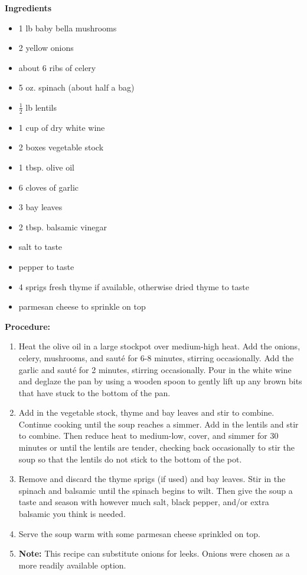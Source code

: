 \begin{multicols}{2}
\textbf{Ingredients}
\begin{itemize}
\item 1 lb baby bella mushrooms 

\item 2 yellow onions 
\item about 6 ribs of celery 
\item 5 oz. spinach (about half a bag)
\item $\frac{1}{2}$ lb lentils 
\item 1 cup of dry white wine 
\item 2 boxes vegetable stock
\item 1 tbsp. olive oil 
\item 6 cloves of garlic
\item 3 bay leaves
\item 2 tbsp. balsamic vinegar
\item salt to taste
\item pepper to taste
\item 4 sprigs fresh thyme if available, otherwise dried thyme to taste
\item parmesan cheese to sprinkle on top 


\end{itemize}


\columnbreak
\textbf{Procedure:}
\medskip


\begin{enumerate}
\item Heat the olive oil in a large stockpot over medium-high heat.  Add the onions, celery, mushrooms, and sauté for 6-8 minutes, stirring occasionally.  Add the garlic and sauté for 2 minutes, stirring occasionally.  Pour in the white wine and deglaze the pan by using a wooden spoon to gently lift up any brown bits that have stuck to the bottom of the pan. 

\item Add in the vegetable stock, thyme and bay leaves and stir to combine.  Continue cooking until the soup reaches a simmer.  Add in the lentils and stir to combine.  Then reduce heat to medium-low, cover, and simmer for 30 minutes or until the lentils are tender, checking back occasionally to stir the soup so that the lentils do not stick to the bottom of the pot.

\item Remove and discard the thyme sprigs (if used) and bay leaves.  Stir in the spinach and balsamic until the spinach begins to wilt.  Then give the soup a taste and season with however much salt, black pepper, and/or extra balsamic you think is needed.

\item Serve the soup warm with some parmesan cheese sprinkled on top.
\item \textbf{Note:} This recipe can substitute onions for leeks. Onions were chosen as a more readily available option. 


 
\end{enumerate}
\end{multicols}